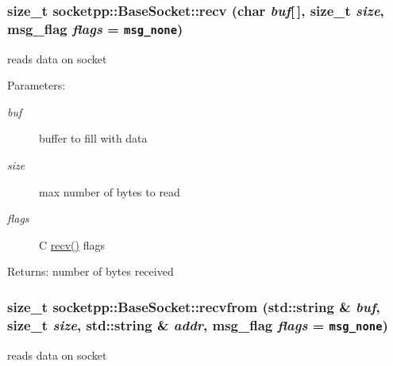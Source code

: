 \begin{CompactItemize}
{\subsubsection[{recv}]{\setlength{\rightskip}{0pt plus 5cm}size\_\-t socketpp::BaseSocket::recv (char {\em buf}\mbox{[}$\,$\mbox{]}, \/  size\_\-t {\em size}, \/  msg\_\-flag {\em flags} = {\tt msg\_\-none})}}
\label{classsocketpp_1_1BaseSocket_d74160ecc96cacec56f61d36f9ab747d}


reads data on socket 

\begin{Desc}
\item[Parameters:]
\begin{description}
\item[{\em buf}]buffer to fill with data \item[{\em size}]max number of bytes to read \item[{\em flags}]C \hyperlink{classsocketpp_1_1BaseSocket_d74160ecc96cacec56f61d36f9ab747d}{recv()} flags \end{description}
\end{Desc}
\begin{Desc}
\item[Returns:]number of bytes received \end{Desc}
\hypertarget{classsocketpp_1_1BaseSocket_8ba6376183fbcce5266775ecc1749e0a}{
\subsubsection[{recvfrom}]{\setlength{\rightskip}{0pt plus 5cm}size\_\-t socketpp::BaseSocket::recvfrom (std::string \& {\em buf}, \/  size\_\-t {\em size}, \/  std::string \& {\em addr}, \/  msg\_\-flag {\em flags} = {\tt msg\_\-none})}}
\label{classsocketpp_1_1BaseSocket_8ba6376183fbcce5266775ecc1749e0a}


reads data on socket 


\end{CompactItemize}
